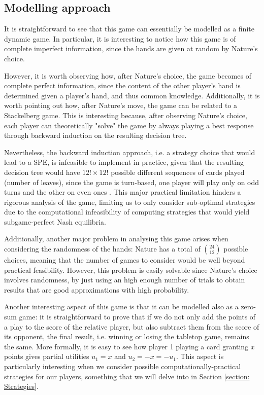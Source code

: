 \subsection{Modelling approach}

It is straightforward to see that this game can essentially be modelled as a finite dynamic game.
In particular, it is interesting to notice how this game is of complete imperfect information, since the hands are given at random by Nature's choice.

However, it is worth observing how, after Nature's choice, the game becomes of complete perfect information, since the content of the other player's hand is determined given a player's hand, and thus common knowledge.
Additionally, it is worth pointing out how, after Nature's move, the game can be related to a Stackelberg game.
This is interesting because, after observing Nature's choice, each player can theoretically "solve" the game by always playing a best response through backward induction on the resulting decision tree.

Nevertheless, the backward induction approach, i.e. a strategy choice that would lead to a SPE, is infeasible to implement in practice, given that the resulting decision tree would have $12!\times12!$ possible different sequences of cards played (number of leaves), since the game is turn-based, one player will play only on odd turns and the other on even ones .
This major practical limitation hinders a rigorous analysis of the game, limiting us to only consider sub-optimal strategies due to the computational infeasibility of computing strategies that would yield subgame-perfect Nash equilibria.

Additionally, another major problem in analysing this game arises when considering the randomness of the hands: Nature has a total of \(\binom{24}{12}\) possible choices, meaning that the number of games to consider would be well beyond practical feasibility.
However, this problem is easily solvable since Nature's choice involves randomness, by just using an high enough number of trials to obtain results that are good approximations with high probability.

Another interesting aspect of this game is that it can be modelled also as a zero-sum game: it is straightforward to prove that if we do not only add the points of a play to the score of the relative player, but also subtract them from the score of its opponent, the final result, i.e. winning or losing the tabletop game, remains the same. More formally, it is easy to see how player 1 playing a card granting $x$ points gives partial utilities $u_1 = x$ and $u_2 = -x = -u_1$.
This aspect is particularly interesting when we consider possible computationally-practical strategies for our players, something that we will delve into in Section \ref{section: Strategies}.

